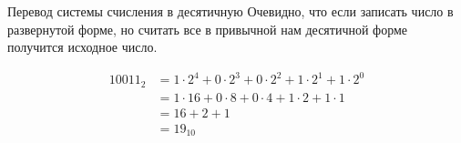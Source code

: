 \documentclass[hyperref=unicode, aspectratio=169]{beamer}
\begin{document}


\begin{frame}{Перевод системы счисления в десятичную}
    Очевидно, что если записать число в развернутой форме, но считать все в привычной нам десятичной форме получится исходное число.
    \begin{example}
        \begin{align*}
            10011_2 & = 1 \cdot 2^4 + 0 \cdot 2^3 + 0 \cdot 2^2 + 1 \cdot 2^1 + 1 \cdot 2^0 \\
                    & = 1 \cdot 16 + 0 \cdot 8 + 0 \cdot 4 + 1 \cdot 2 + 1 \cdot 1          \\
                    & = 16 + 2 + 1                                                          \\
                    & = 19_{10}
        \end{align*}
    \end{example}
\end{frame}

\end{document}
